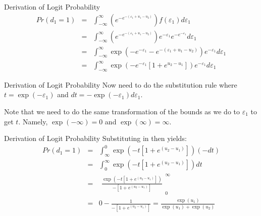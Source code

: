 \documentclass[english,aspectratio=169,12pt,xcolor=dvipsnames]{beamer}
\begin{document}
\begin{frame}[noframenumbering]{Derivation of Logit Probability}
\begin{eqnarray*}
Pr(d_1=1)&=&\int_{-\infty}^{\infty}\left(e^{-e^{-(\varepsilon_1+u_1-u_2)}}\right)f(\varepsilon_1)d\varepsilon_1\\
&=&\int_{-\infty}^{\infty}\left(e^{-e^{-(\varepsilon_1+u_1-u_2)}}\right)e^{-\varepsilon_1}e^{-e^{-\varepsilon_1}}d\varepsilon_1\\
&=&\int_{-\infty}^{\infty}\exp\left(-e^{-\varepsilon_1}-e^{-(\varepsilon_1+u_1-u_2)}\right)e^{-\varepsilon_1}d\varepsilon_1\\
&=&\int_{-\infty}^{\infty}\exp\left(-e^{-\varepsilon_1}\left[1+e^{u_2-u_1}\right]\right)e^{-\varepsilon_1}d\varepsilon_1
\end{eqnarray*}
\end{frame}

\begin{frame}[noframenumbering]{Derivation of Logit Probability}
Now need to do the substitution rule where $t=\exp(-\varepsilon_1)$ and $dt=-\exp(-\varepsilon_1)d\varepsilon_1$.  

\bigskip

Note that we need to do the same transformation of the bounds as we do to $\varepsilon_1$ to get $t$.  Namely, $\exp(-\infty)=0$ and $\exp(\infty)=\infty$.
\end{frame}

\begin{frame}[noframenumbering]{Derivation of Logit Probability}
Substituting in then yields:
\begin{eqnarray*}
Pr(d_1=1)&=&\int_{\infty}^0\exp\left(-t\left[1+e^{(u_2-u_1)}\right]\right)(-dt)\\
&=&\int_0^{\infty}\exp\left(-t\left[1+e^{(u_2-u_1)}\right]\right)dt\\
&=&\begin{array}{c|}\frac{\exp\left(-t\left[1+e^{(u_2-u_1)}\right]\right)}{-\left[1+e^{(u_2-u_1)}\right]}\end{array}^{\infty}_{0}\\
&=&0-\frac{1}{-\left[1+e^{(u_2-u_1)}\right]}=\frac{\exp(u_1)}{\exp(u_1)+\exp(u_2)}
\end{eqnarray*}
\end{frame}

%
%
\end{document}
